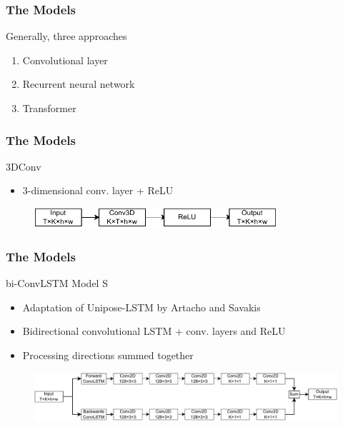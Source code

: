 \documentclass{beamer}
\begin{document}
\begin{frame}
    \frametitle{The Models}
    Generally, three approaches
    \begin{enumerate}
        \item Convolutional layer
        \item Recurrent neural network
        \item Transformer
    \end{enumerate}
\end{frame}

\begin{frame}
    \frametitle{The Models}
    3DConv
    \begin{itemize}
        \item<1-> 3-dimensional conv. layer + ReLU
    \end{itemize}
    \begin{figure}
        \centering
        \includegraphics[width = 0.8\textwidth]{../report/entities/baseline.pdf}
    \end{figure}
\end{frame}

\begin{frame}
    \frametitle{The Models}
    bi-ConvLSTM Model S
    \begin{itemize}
        \item<1-> Adaptation of Unipose-LSTM by Artacho and Savakis
        \item<1-> Bidirectional convolutional LSTM + conv. layers and ReLU
        \item<1-> Processing directions summed together
    \end{itemize}
    \begin{figure}
        \centering
        \includegraphics[width = \textwidth]{../report/entities/bi_conv_lstm.pdf}
    \end{figure}
\end{frame}
\end{document}
